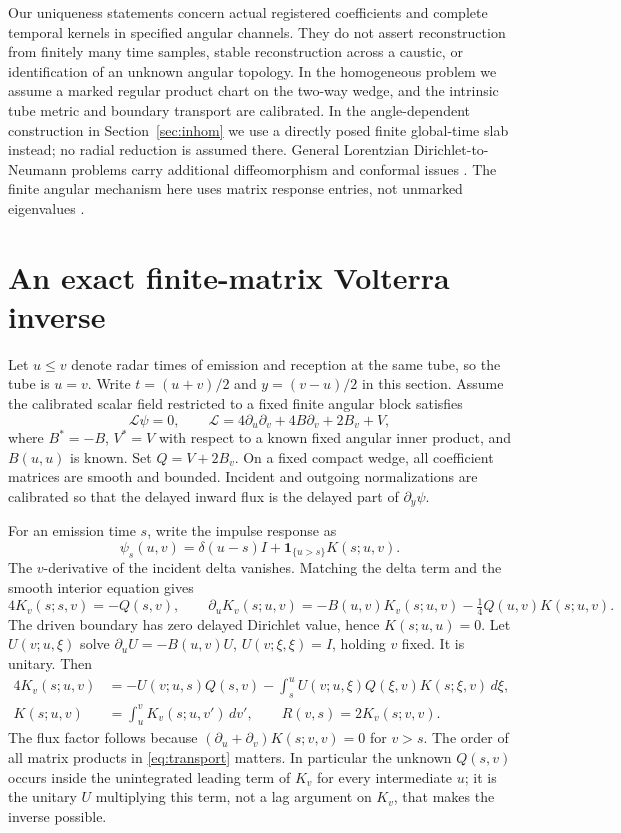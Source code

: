 \documentclass[11pt]{article}
\begin{document}
Our uniqueness statements concern actual registered coefficients and complete temporal kernels in specified angular channels. They do not assert reconstruction from finitely many time samples, stable reconstruction across a caustic, or identification of an unknown angular topology. In the homogeneous problem we assume a marked regular product chart on the two-way wedge, and the intrinsic tube metric and boundary transport are calibrated. In the angle-dependent construction in Section~\ref{sec:inhom} we use a directly posed finite global-time slab instead; no radial reduction is assumed there. General Lorentzian Dirichlet-to-Neumann problems carry additional diffeomorphism and conformal issues \cite{StefanovYang,LiimatainenOksanen}. The finite angular mechanism here uses matrix response entries, not unmarked eigenvalues \cite{AvdoninBelishevIvanov,GordonSchuethSutton}.

\section{An exact finite-matrix Volterra inverse}

Let \(u\le v\) denote radar times of emission and reception at the same tube, so the tube is \(u=v\). Write \(t=(u+v)/2\) and \(y=(v-u)/2\) in this section. Assume the calibrated scalar field restricted to a fixed finite angular block satisfies
\begin{equation}\label{eq:L}
 \mathcal L\psi=0,\qquad
 \mathcal L=4\partial_u\partial_v+4B\partial_v+2B_v+V ,
\end{equation}
where \(B^*=-B\), \(V^*=V\) with respect to a known fixed angular inner product, and \(B(u,u)\) is known. Set \(Q=V+2B_v\). On a fixed compact wedge, all coefficient matrices are smooth and bounded. Incident and outgoing normalizations are calibrated so that the delayed inward flux is the delayed part of \(\partial_y\psi\).

For an emission time \(s\), write the impulse response as
\[
 \psi_s(u,v)=\delta(u-s)I+\mathbf 1_{\{u>s\}}K(s;u,v).
\]
The \(v\)-derivative of the incident delta vanishes. Matching the delta term and the smooth interior equation gives
\[
 4K_v(s;s,v)=-Q(s,v),\qquad
 \partial_u K_v(s;u,v)=-B(u,v)K_v(s;u,v)-\tfrac14 Q(u,v)K(s;u,v).
\]
The driven boundary has zero delayed Dirichlet value, hence \(K(s;u,u)=0\). Let \(U(v;u,\xi)\) solve \(\partial_u U=-B(u,v)U\), \(U(v;\xi,\xi)=I\), holding \(v\) fixed. It is unitary. Then
\begin{align}
4K_v(s;u,v)&=-U(v;u,s)Q(s,v)
 -\int_s^u U(v;u,\xi)Q(\xi,v)K(s;\xi,v)\,d\xi,\label{eq:transport}\\
K(s;u,v)&=\int_u^v K_v(s;u,v')\,dv',
\qquad R(v,s)=2K_v(s;v,v).\label{eq:readout}
\end{align}
The flux factor follows because \((\partial_u+\partial_v)K(s;v,v)=0\) for \(v>s\). The order of all matrix products in \eqref{eq:transport} matters. In particular the unknown \(Q(s,v)\) occurs inside the unintegrated leading term of \(K_v\) for every intermediate \(u\); it is the unitary \(U\) multiplying this term, not a lag argument on \(K_v\), that makes the inverse possible.
\end{document}
